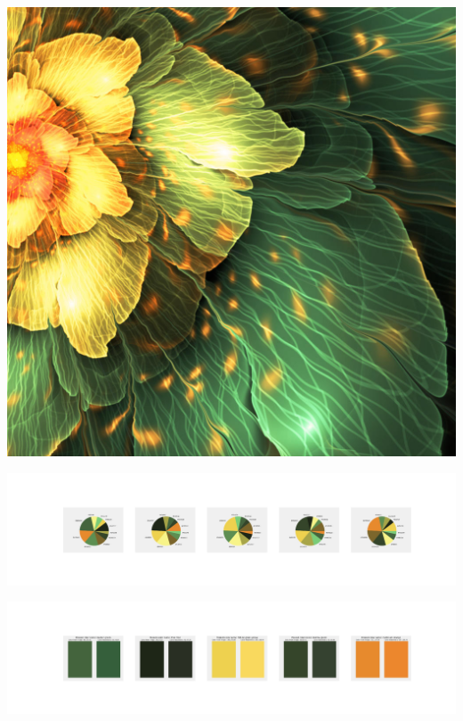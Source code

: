 \documentclass[11pt]{article}
\begin{document}
\begin{landscape}
    \begin{center}
    \includegraphics[width=\textwidth]{./nbimg/file (275).jpg}
    \end{center}

    \begin{center}
    \includegraphics[width=250mm]{./nbimg/pie-195.jpg}
    \end{center}

    \begin{center}
    \includegraphics[width=250mm]{./nbimg/peak-195.jpg}
    \end{center}
    


\end{landscape}
\end{document}
